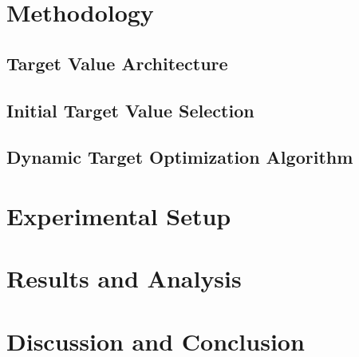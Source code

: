 \documentclass[12pt,fleqn,a4paper]{article}
\begin{document}
\section{Methodology}
\subsection{Target Value Architecture}
\subsection{Initial Target Value Selection}
\subsection{Dynamic Target Optimization Algorithm}

\section{Experimental Setup}

\section{Results and Analysis}

\section{Discussion and Conclusion}

\newpage
\end{document}
